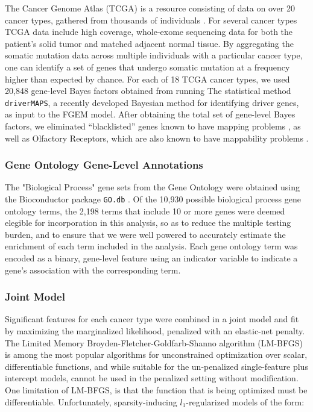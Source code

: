The Cancer Genome Atlas (TCGA) is a resource consisting of data on over 20 cancer types, gathered from thousands of individuals \cite{TCGA}.  For several cancer types TCGA data include high coverage, whole-exome sequencing data for both the patient's solid tumor and matched adjacent normal tissue. By aggregating the somatic mutation data across multiple individuals with a particular cancer type, one can identify a set of genes that undergo somatic mutation at a frequency higher than expected by chance.  For each of 18 TCGA cancer types, we used 20,848 gene-level Bayes factors obtained from running The statistical method \texttt{driverMAPS}, a recently developed Bayesian method for identifying driver genes, as input to the FGEM model.  After obtaining the total set of gene-level Bayes factors, we eliminated ``blacklisted'' genes known to have mapping problems \cite{drivermapsblacklist}, as well as Olfactory Receptors, which are also known to have mappability problems \cite{Derrien_2012}.

\subsubsection{Gene Ontology Gene-Level Annotations}\label{sec:orgd117550}

The "Biological Process" gene sets from the Gene Ontology were obtained using the Bioconductor package \texttt{GO.db} \cite{godb}. Of the 10,930 possible biological process gene ontology terms, the 2,198 terms that 
include 10 or more genes were deemed elegible for incorporation in this analysis, so as to reduce the multiple testing burden, and to ensure that we were well powered to accurately estimate the enrichment of each term included in the analysis.  Each gene ontology term was encoded as a binary, gene-level feature using an indicator variable to indicate a gene's association with the corresponding term. 

\subsubsection{Joint Model}\label{sec:orga62a234}

Significant features for each cancer type were combined in a joint model and fit by maximizing the marginalized likelihood, penalized with an elastic-net penalty.  The Limited Memory Broyden-Fletcher-Goldfarb-Shanno algorithm (LM-BFGS) \cite{LMBFGS} is among the most popular algorithms
for unconstrained optimization over scalar, differentiable functions, and while suitable for the un-penalized single-feature plus intercept models, cannot be used in the penalized setting without modification.  One limitation of LM-BFGS, is that the function that is being optimized must be differentiable.  Unfortunately, sparsity-inducing $l_{\text{1}}$-regularized models of the form:

